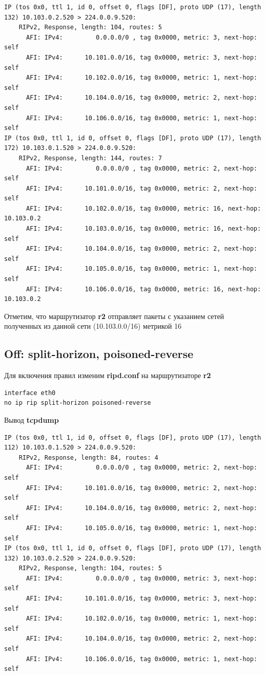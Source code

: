 \documentclass[a4paper,12pt]{article}
\begin{document}
\begin{verbatim}
IP (tos 0x0, ttl 1, id 0, offset 0, flags [DF], proto UDP (17), length 132) 10.103.0.2.520 > 224.0.0.9.520: 
	RIPv2, Response, length: 104, routes: 5
	  AFI: IPv4:         0.0.0.0/0 , tag 0x0000, metric: 3, next-hop: self
	  AFI: IPv4:      10.101.0.0/16, tag 0x0000, metric: 3, next-hop: self
	  AFI: IPv4:      10.102.0.0/16, tag 0x0000, metric: 1, next-hop: self
	  AFI: IPv4:      10.104.0.0/16, tag 0x0000, metric: 2, next-hop: self
	  AFI: IPv4:      10.106.0.0/16, tag 0x0000, metric: 1, next-hop: self
IP (tos 0x0, ttl 1, id 0, offset 0, flags [DF], proto UDP (17), length 172) 10.103.0.1.520 > 224.0.0.9.520: 
	RIPv2, Response, length: 144, routes: 7
	  AFI: IPv4:         0.0.0.0/0 , tag 0x0000, metric: 2, next-hop: self
	  AFI: IPv4:      10.101.0.0/16, tag 0x0000, metric: 2, next-hop: self
	  AFI: IPv4:      10.102.0.0/16, tag 0x0000, metric: 16, next-hop: 10.103.0.2
	  AFI: IPv4:      10.103.0.0/16, tag 0x0000, metric: 16, next-hop: self
	  AFI: IPv4:      10.104.0.0/16, tag 0x0000, metric: 2, next-hop: self
	  AFI: IPv4:      10.105.0.0/16, tag 0x0000, metric: 1, next-hop: self
	  AFI: IPv4:      10.106.0.0/16, tag 0x0000, metric: 16, next-hop: 10.103.0.2
\end{verbatim}

Отметим, что маршрутизатор \textbf{r2} отправляет пакеты с указанием сетей полученных из данной сети (10.103.0.0/16) метрикой 16

\subsection{Off: split-horizon, poisoned-reverse}

Для включения правил изменим \textbf{ripd.conf} на маршрутизаторе \textbf{r2}
\begin{verbatim}
interface eth0
no ip rip split-horizon poisoned-reverse
\end{verbatim}

Вывод \textbf{tcpdump}

\begin{verbatim}
IP (tos 0x0, ttl 1, id 0, offset 0, flags [DF], proto UDP (17), length 112) 10.103.0.1.520 > 224.0.0.9.520: 
	RIPv2, Response, length: 84, routes: 4
	  AFI: IPv4:         0.0.0.0/0 , tag 0x0000, metric: 2, next-hop: self
	  AFI: IPv4:      10.101.0.0/16, tag 0x0000, metric: 2, next-hop: self
	  AFI: IPv4:      10.104.0.0/16, tag 0x0000, metric: 2, next-hop: self
	  AFI: IPv4:      10.105.0.0/16, tag 0x0000, metric: 1, next-hop: self
IP (tos 0x0, ttl 1, id 0, offset 0, flags [DF], proto UDP (17), length 132) 10.103.0.2.520 > 224.0.0.9.520: 
	RIPv2, Response, length: 104, routes: 5
	  AFI: IPv4:         0.0.0.0/0 , tag 0x0000, metric: 3, next-hop: self
	  AFI: IPv4:      10.101.0.0/16, tag 0x0000, metric: 3, next-hop: self
	  AFI: IPv4:      10.102.0.0/16, tag 0x0000, metric: 1, next-hop: self
	  AFI: IPv4:      10.104.0.0/16, tag 0x0000, metric: 2, next-hop: self
	  AFI: IPv4:      10.106.0.0/16, tag 0x0000, metric: 1, next-hop: self
\end{verbatim}
\end{document}
